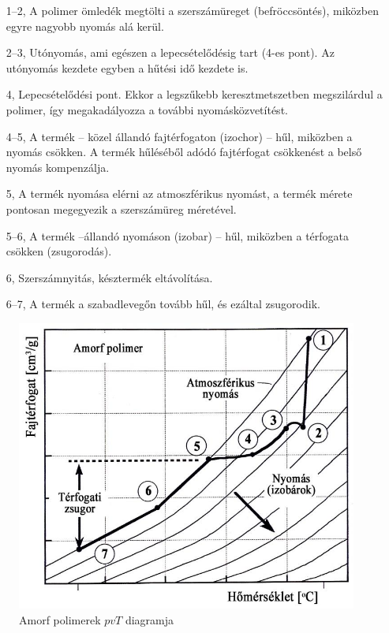 \documentclass[12pt,a4paper]{article}       %
\newcounter{questionctr}
\newenvironment{question}[1]{
  \refstepcounter{questionctr}
  \begin{tcolorbox}[
    colback=gray!25,
    colbacktitle=red!10!yellow!50,
    enhanced,
    sharp corners,
    boxrule=0mm,
    frame hidden,
    breakable,
    enhanced jigsaw,
    title={\textcolor{black}{\textsc{\# \thequestionctr{} – #1}}}
  ]


}{\end{tcolorbox}}
\begin{document}
\begin{question}{
    Mutassa be az amorf hőre lágyuló polimerek tipikus fröccsöntési ciklusát
    $pvT$ állapotábra segítségével és részletesen magyarázza el az egyes pontok
    jelentését.
  }
  \begin{itemize}
    \item[1–2,] A polimer ömledék megtölti a szerszámüreget (befröccsöntés),
      miközben egyre nagyobb nyomás alá kerül.
    \item[2–3,] Utónyomás, ami egészen a lepecsételődésig tart (4-es pont). Az
      utónyomás kezdete egyben a hűtési idő kezdete is.
    \item[4,] Lepecsételődési pont. Ekkor a legszűkebb keresztmetszetben
      megszilárdul a polimer, így megakadályozza a további nyomásközvetítést.
    \item[4–5,] A termék – közel állandó fajtérfogaton (izochor) – hűl,
      miközben a nyomás csökken. A termék hűléséből adódó fajtérfogat
      csökkenést a belső nyomás kompenzálja.
    \item[5,] A termék nyomása elérni az atmoszférikus nyomást, a termék mérete
      pontosan megegyezik a szerszámüreg méretével.
    \item[5–6,] A termék –állandó nyomáson (izobar) – hűl, miközben a térfogata
      csökken (zsugorodás).
    \item[6,] Szerszámnyitás, késztermék eltávolítása.
    \item[6–7,] A termék a szabadlevegőn tovább hűl, és ezáltal zsugorodik.
  \end{itemize}
  \begin{figure}[H]
    \centering
    \includegraphics{./static/amorffroccs.png}
    \caption{Amorf polimerek $pvT$ diagramja}
    \label{fig:pvT}
  \end{figure}
\end{question}
\end{document}
